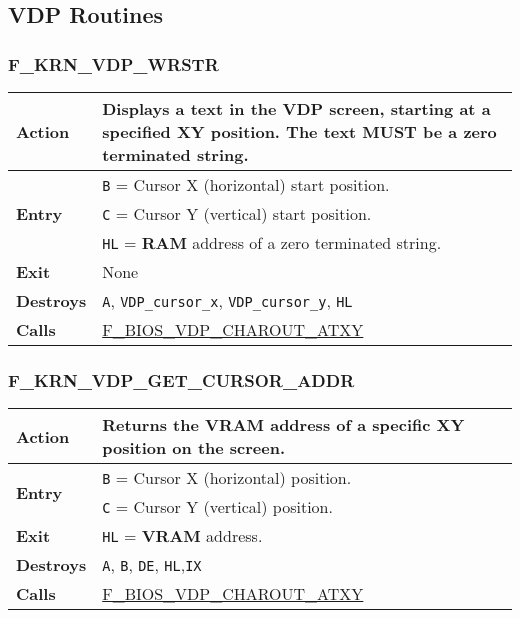\subsection{VDP Routines}

    \subsubsection{F\_KRN\_VDP\_WRSTR}
    \label{func:fkrnvdpwrstr}
    \begin{tabular}{l p{9cm}}
        \hline\textbf{Action}
        & Displays a text in the VDP screen, starting at a specified XY
        position. The text MUST be a zero terminated string. \\
        \hline\multirow[t]{3}{4em}{\textbf{Entry}}
        & \texttt{B} = Cursor X (horizontal) start position.\\
        & \texttt{C} = Cursor Y (vertical) start position.\\
        & \texttt{HL} = \textbf{RAM} address of a zero terminated string.\\
        \hline\textbf{Exit} & None\\
        \hline\textbf{Destroys} & \texttt{A}, \texttt{VDP\_cursor\_x},
            \texttt{VDP\_cursor\_y}, \texttt{HL} \\
        \hline\textbf{Calls} & 
        \hyperref[func:fbiosvdpcharoutatxy]{F\_BIOS\_VDP\_CHAROUT\_ATXY}\\
        \hline
    \end{tabular}

    \subsubsection{F\_KRN\_VDP\_GET\_CURSOR\_ADDR}
    \label{func:fkrnvdpgetcursoraddr}
    \begin{tabular}{l p{9cm}}
        \hline\textbf{Action}
        & Returns the \textbf{VRAM} address of a specific XY position on the
        screen. \\
        \hline\multirow[t]{2}{4em}{\textbf{Entry}}
        & \texttt{B} = Cursor X (horizontal) position.\\
        & \texttt{C} = Cursor Y (vertical) position.\\
        \hline\textbf{Exit} & \texttt{HL} = \textbf{VRAM} address.\\
        \hline\textbf{Destroys} & \texttt{A}, \texttt{B}, \texttt{DE},
            \texttt{HL},\texttt{IX} \\
        \hline\textbf{Calls} & 
        \hyperref[func:fbiosvdpcharoutatxy]{F\_BIOS\_VDP\_CHAROUT\_ATXY}\\
        \hline
    \end{tabular}

